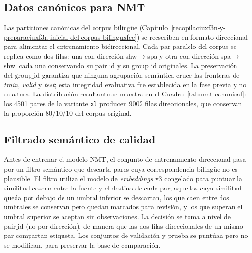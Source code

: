 \documentclass[12pt,a4paper,oneside]{book}
\begin{document}
\subsection{Datos canónicos para NMT}\label{nmt-datos}

Las particiones canónicas del corpus bilingüe (Capítulo~\ref{recopilaciuxf3n-y-preparaciuxf3n-inicial-del-corpus-bilinguxfce}) se reescriben en formato direccional para alimentar el entrenamiento bidireccional. Cada par paralelo del corpus se replica como dos filas: una con dirección shw\(\rightarrow\)spa y otra con dirección spa\(\rightarrow\)shw, cada una conservando su \(\text{pair\_id}\) y su \(\text{group\_id}\) originales. La preservación del \(\text{group\_id}\) garantiza que ninguna agrupación semántica cruce las fronteras de \emph{train}, \emph{valid} y \emph{test}; esta integridad evaluativa fue establecida en la fase previa y no se altera. La distribución resultante se muestra en el Cuadro~\ref{tab:nmt-canonical}: los 4501 pares de la variante \texttt{xl} producen 9002 filas direccionales, que conservan la proporción 80/10/10 del corpus original.

\begin{table}[h]
\centering
\caption{Distribución del corpus canónico bidireccional para entrenamiento NMT (variante \texttt{xl}).}
\label{tab:nmt-canonical}

\end{table}

\subsection{Filtrado semántico de calidad}\label{nmt-filtrado}

Antes de entrenar el modelo NMT, el conjunto de entrenamiento direccional pasa por un filtro semántico que descarta pares cuya correspondencia bilingüe no es plausible. El filtro utiliza el modelo de \emph{embeddings} v3 congelado para puntuar la similitud coseno entre la fuente y el destino de cada par; aquellos cuya similitud queda por debajo de un umbral inferior se descartan, los que caen entre dos umbrales se conservan pero quedan marcados para revisión, y los que superan el umbral superior se aceptan sin observaciones. La decisión se toma a nivel de \(\text{pair\_id}\) (no por dirección), de manera que las dos filas direccionales de un mismo par compartan etiqueta. Los conjuntos de validación y prueba se puntúan pero no se modifican, para preservar la base de comparación.
\end{document}
